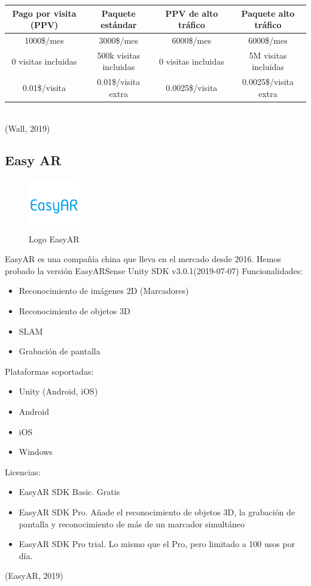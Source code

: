 \begin{center}
\begin{tabular}{| c| c |c| c |}
 Pago por visita (PPV)&	Paquete estándar&PPV de alto tráfico&Paquete alto tráfico \\
 \hline
  1000\$/mes	& 3000\$/mes	& 6000\$/mes &	6000\$/mes \\  
  \hline
 0 visitas incluidas &	500k visitas incluidas&	0 visitas incluidas	&5M visitas incluidas\\
 \hline
 0.01\$/visita&	0.01\$/visita extra&	0.0025\$/visita&	0.0025\$/visita extra\\
 \hline
\end{tabular}
\caption{Licencias 8th Wall}
\end{center}
\\
(Wall, 2019)

\subsection{Easy AR}
\begin{figure}[H]
    \centering
    \includegraphics[width=0.2\textwidth]{Images/EasyAR.png}
    \caption{Logo EasyAR}
    \label{fig:my_label}
\end{figure}

EasyAR es una compañía china que lleva en el mercado desde 2016. Hemos probado la versión EasyARSense Unity SDK v3.0.1(2019-07-07)
Funcionalidades:
\begin{itemize}
\item Reconocimiento de imágenes 2D (Marcadores)
\item Reconocimiento de objetos 3D
\item SLAM
\item Grabación de pantalla
\end{itemize}
Plataformas soportadas:
\begin{itemize}
\item Unity (Android, iOS)
\item Android
\item iOS
\item Windows
\end{itemize}
Licencias:
\begin{itemize}
\item EasyAR SDK Basic. Gratis
\item EasyAR SDK Pro. Añade el reconocimiento de objetos 3D, la grabación de pantalla y reconocimiento de más de un marcador simultáneo
\item EasyAR SDK Pro trial. Lo mismo que el Pro, pero limitado a 100 usos por día.
\end{itemize}
(EasyAR, 2019)

